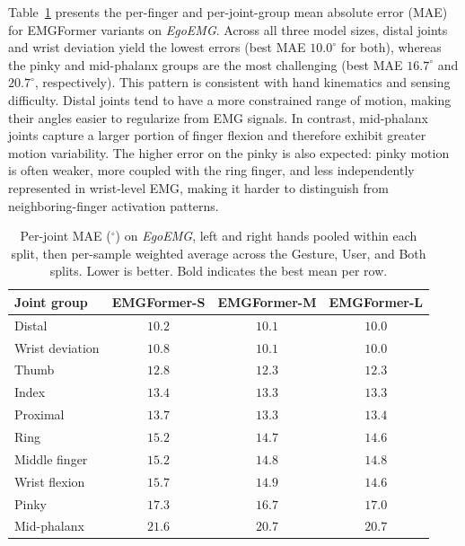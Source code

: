 \documentclass[letterpaper]{article} %
\newcommand{\dataset}{\textit{EgoEMG}}
\newcommand{\model}{EMGFormer}
\begin{document}
Table~\ref{tab:per_joint_egoemg} presents the per-finger and per-joint-group mean absolute error (MAE) for \model{} variants on \dataset{}. Across all three model sizes, distal joints and wrist deviation yield the lowest errors (best MAE $10.0^\circ$ for both), whereas the pinky and mid-phalanx groups are the most challenging (best MAE $16.7^\circ$ and $20.7^\circ$, respectively). This pattern is consistent with hand kinematics and sensing difficulty. Distal joints tend to have a more constrained range of motion, making their angles easier to regularize from EMG signals. In contrast, mid-phalanx joints capture a larger portion of finger flexion and therefore exhibit greater motion variability. The higher error on the pinky is also expected: pinky motion is often weaker, more coupled with the ring finger, and less independently represented in wrist-level EMG, making it harder to distinguish from neighboring-finger activation patterns.

\begin{table}[t]
\centering
\caption{Per-joint MAE ($^\circ$) on \dataset{}, left and right hands pooled within each split, then per-sample weighted average across the Gesture, User, and Both splits. Lower is better. Bold indicates the best mean per row.}
\label{tab:per_joint_egoemg}
\footnotesize
\setlength{\tabcolsep}{2.0pt}
\renewcommand{\arraystretch}{1.05}
\begin{tabular}{lccc}
\toprule
Joint group & \model{}-S & \model{}-M & \model{}-L \\
\midrule
Distal & $10.2$ & $10.1$ & $\mathbf{10.0}$ \\
Wrist deviation & $10.8$ & $10.1$ & $\mathbf{10.0}$ \\
Thumb & $12.8$ & $\mathbf{12.3}$ & $\mathbf{12.3}$ \\
Index & $13.4$ & $\mathbf{13.3}$ & $\mathbf{13.3}$ \\
Proximal & $13.7$ & $\mathbf{13.3}$ & $13.4$ \\
Ring & $15.2$ & $14.7$ & $\mathbf{14.6}$ \\
Middle finger & $15.2$ & $14.8$ & $\mathbf{14.8}$ \\
Wrist flexion & $15.7$ & $14.9$ & $\mathbf{14.6}$ \\
Pinky & $17.3$ & $\mathbf{16.7}$ & $17.0$ \\
Mid-phalanx & $21.6$ & $\mathbf{20.7}$ & $\mathbf{20.7}$ \\
\bottomrule
\end{tabular}
\end{table}
\end{document}
